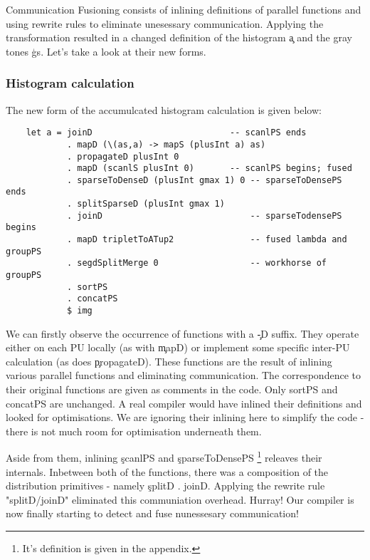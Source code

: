       Communication Fusioning consists of inlining definitions of parallel functions and using rewrite rules to eliminate
      unesessary communication. Applying the transformation resulted in a changed definition of the histogram \c{a} and the
      gray tones \c{gs}. Let's take a look at their new forms.
      
      \subsubsection{Histogram calculation}
        The new form of the accumulcated histogram calculation is given below:
        \begin{lstlisting}
    let a = joinD                           -- scanlPS ends
            . mapD (\(as,a) -> mapS (plusInt a) as)
            . propagateD plusInt 0
            . mapD (scanlS plusInt 0)       -- scanlPS begins; fused
            . sparseToDenseD (plusInt gmax 1) 0 -- sparseToDensePS ends
            . splitSparseD (plusInt gmax 1)     
            . joinD                             -- sparseTodensePS begins
            . mapD tripletToATup2               -- fused lambda and groupPS 
            . segdSplitMerge 0                  -- workhorse of groupPS
            . sortPS
            . concatPS
            $ img
        \end{lstlisting}
        We can firstly observe the occurrence of functions with a \c{-D} suffix. They operate either
        on each PU locally (as with \c{mapD}) or implement some specific inter-PU calculation (as does \c{propagateD}).
        These functions are the result of inlining various parallel functions and eliminating communication.
        The correspondence to their original functions are given as comments in the code. Only sortPS and concatPS
        are unchanged. A real compiler would have inlined their definitions and looked for optimisations.
        We are ignoring their inlining here to simplify the code - there is not much room for optimisation underneath them.
        
        
        Aside from them, inlining \c{scanlPS} and \c{sparseToDensePS}
        \footnote[1]{It's definition is given in the appendix.} releaves their internals.
        Inbetween both of the functions, there was a composition of the distribution primitives - namely \c{splitD . joinD}.
        Applying the rewrite rule "splitD/joinD" eliminated this communiation overhead. Hurray! Our compiler
        is now finally starting to detect and fuse nunessesary communication!
        
